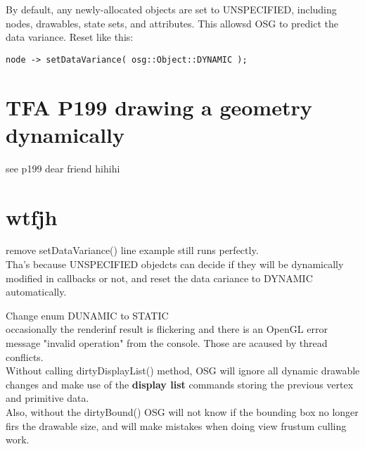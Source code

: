 \documentclass[a4paper,12pt]{book}
\begin{document}
By default, any newly-allocated objects are set to UNSPECIFIED, including nodes, drawables, state sets, and attributes. This allowsd OSG to predict the data variance.
Reset like this:\\
\begin{lstlisting}
node -> setDataVariance( osg::Object::DYNAMIC );
\end{lstlisting}

\section{TFA P199 drawing a geometry dynamically}

see p199 dear friend hihihi

\section{wtfjh}
remove setDataVariance() line \textrightarrow example still runs perfectly.\\
Tha's because UNSPECIFIED objedcts can decide if they will be dynamically modified in callbacks or not, and reset the data cariance to DYNAMIC automatically.

Change enum DUNAMIC to STATIC\\
\textrightarrow occasionally the renderinf result is flickering and there is an OpenGL error message "invalid operation" from the console. Those are acaused by thread conflicts.\\

Without calling dirtyDisplayList() method, OSG will ignore all dynamic drawable changes and make use of the \textbf{display list} commands storing the previous vertex and primitive data.\\
Also, without the dirtyBound() OSG will not know if the bounding box no longer firs the drawable size, and will make mistakes when doing view frustum culling work.\\
\end{document}
